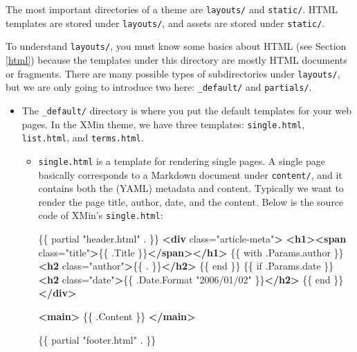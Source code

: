 \documentclass[12pt,]{krantz}
\makeatletter
\newenvironment{Shaded}{\begin{snugshade}}{\end{snugshade}}
\newcommand{\KeywordTok}[1]{\textcolor[rgb]{0.13,0.29,0.53}{\textbf{#1}}}
\newcommand{\StringTok}[1]{\textcolor[rgb]{0.31,0.60,0.02}{#1}}
\newcommand{\OtherTok}[1]{\textcolor[rgb]{0.56,0.35,0.01}{#1}}
\newcommand{\NormalTok}[1]{#1}
\newenvironment{kframe}{%
\medskip{}
\setlength{\fboxsep}{.8em}
 \def\at@end@of@kframe{}%
 \ifinner\ifhmode%
  \def\at@end@of@kframe{\end{minipage}}%
  \begin{minipage}{\columnwidth}%
 \fi\fi%
 \def\FrameCommand##1{\hskip\@totalleftmargin \hskip-\fboxsep
 \colorbox{shadecolor}{##1}\hskip-\fboxsep
     \hskip-\linewidth \hskip-\@totalleftmargin \hskip\columnwidth}%
 \MakeFramed {\advance\hsize-\width
   \@totalleftmargin\z@ \linewidth\hsize
   \@setminipage}}%
 {\par\unskip\endMakeFramed%
 \at@end@of@kframe}
\renewenvironment{Shaded}{\begin{kframe}}{\end{kframe}}
\theoremstyle{definition}
\theoremstyle{definition}
\theoremstyle{definition}
\theoremstyle{remark}
\makeatother
\begin{document}
The most important directories of a theme are \texttt{layouts/} and
\texttt{static/}. HTML templates are stored under \texttt{layouts/}, and
assets are stored under \texttt{static/}.

To understand \texttt{layouts/}, you must know some basics about HTML
(see Section \ref{html}) because the templates under this directory are
mostly HTML documents or fragments. There are many possible types of
subdirectories under \texttt{layouts/}, but we are only going to
introduce two here: \texttt{\_default/} and \texttt{partials/}.

\begin{itemize}
\item
  The \texttt{\_default/} directory is where you put
  the default templates for your web pages. In the XMin theme, we have
  three templates: \texttt{single.html}, \texttt{list.html}, and
  \texttt{terms.html}.

  \begin{itemize}
  \item
    \texttt{single.html} is a template for rendering
    single pages. A single page basically corresponds to a Markdown
    document under \texttt{content/}, and it contains both the (YAML)
    metadata and content. Typically we want to render the page title,
    author, date, and the content. Below is the source code of XMin's
    \texttt{single.html}:

\begin{Shaded}
\begin{Highlighting}[]
\NormalTok{\{\{ partial "header.html" . \}\}}
\KeywordTok{<div}\OtherTok{ class=}\StringTok{"article-meta"}\KeywordTok{>}
\KeywordTok{<h1><span}\OtherTok{ class=}\StringTok{"title"}\KeywordTok{>}\NormalTok{\{\{ .Title \}\}}\KeywordTok{</span></h1>}
\NormalTok{\{\{ with .Params.author \}\}}
\KeywordTok{<h2}\OtherTok{ class=}\StringTok{"author"}\KeywordTok{>}\NormalTok{\{\{ . \}\}}\KeywordTok{</h2>}
\NormalTok{\{\{ end \}\}}
\NormalTok{\{\{ if .Params.date \}\}}
\KeywordTok{<h2}\OtherTok{ class=}\StringTok{"date"}\KeywordTok{>}\NormalTok{\{\{ .Date.Format "2006/01/02" \}\}}\KeywordTok{</h2>}
\NormalTok{\{\{ end \}\}}
\KeywordTok{</div>}

\KeywordTok{<main>}
\NormalTok{\{\{ .Content \}\}}
\KeywordTok{</main>}

\NormalTok{\{\{ partial "footer.html" . \}\}}
\end{Highlighting}
\end{Shaded}


\end{itemize}
\end{itemize}
\end{document}
